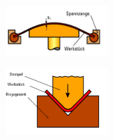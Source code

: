 \begin{minipage}{0.49\linewidth}
    \includegraphics[width = 40mm]{src/images/Strecken.png}
\end{minipage}
\begin{minipage}{0.49\linewidth}
    \includegraphics[width = 40mm]{src/images/Biegen.png}
\end{minipage} \\
